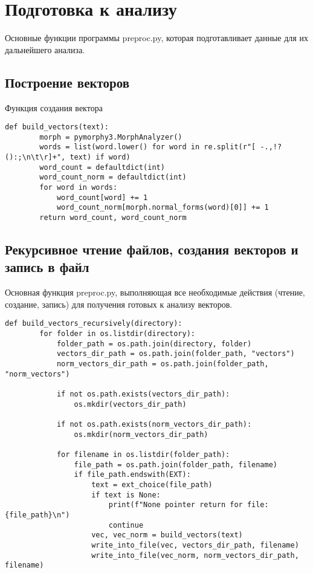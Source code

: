 \section{Подготовка к анализу}

Основные функции программы preproc.py, которая подготавливает данные для их дальнейшего анализа.

\subsection{Построение векторов}

Функция создания вектора

\begin{lstlisting}[label=b-vector, caption={Построение векторов (обычного и нормализированного для одного документа)}]
    def build_vectors(text):
        morph = pymorphy3.MorphAnalyzer()
        words = list(word.lower() for word in re.split(r"[ -.,!?():;\n\t\r]+", text) if word)
        word_count = defaultdict(int)
        word_count_norm = defaultdict(int)
        for word in words:
            word_count[word] += 1
            word_count_norm[morph.normal_forms(word)[0]] += 1
        return word_count, word_count_norm
\end{lstlisting}

\subsection{Рекурсивное чтение файлов, создания векторов и запись в файл}

Основная функция preproc.py, выполняющая все необходимые действия (чтение, создание, запись) для получения готовых к анализу векторов.

\begin{lstlisting}[label=b-vector-all, caption={Получение всех векторов}]
    def build_vectors_recursively(directory):
        for folder in os.listdir(directory):
            folder_path = os.path.join(directory, folder)
            vectors_dir_path = os.path.join(folder_path, "vectors")
            norm_vectors_dir_path = os.path.join(folder_path, "norm_vectors")

            if not os.path.exists(vectors_dir_path):
                os.mkdir(vectors_dir_path)

            if not os.path.exists(norm_vectors_dir_path):
                os.mkdir(norm_vectors_dir_path)

            for filename in os.listdir(folder_path):
                file_path = os.path.join(folder_path, filename)
                if file_path.endswith(EXT):
                    text = ext_choice(file_path)
                    if text is None:
                        print(f"None pointer return for file: {file_path}\n")
                        continue
                    vec, vec_norm = build_vectors(text)
                    write_into_file(vec, vectors_dir_path, filename)
                    write_into_file(vec_norm, norm_vectors_dir_path, filename)
\end{lstlisting}

